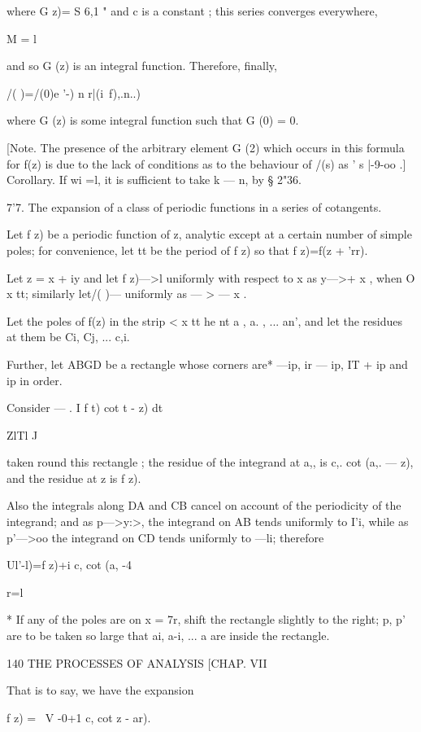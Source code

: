 {where G z)= S 6,1 " and c is a constant ; this series converges
everywhere,

M = l

and so G (z) is an integral function. Therefore, finally,

/( )=/(0)e '-) n r|(i\ f),.n..)

where G (z) is some integral function such that G (0) = 0.

[Note. The presence of the arbitrary element G (2) which occurs in
this formula for f(z) is due to the lack of conditions as to the
behaviour of /(s) as ' s |-9-oo .] Corollary. If wi =l, it is
sufficient to take k — n, by § 2"36.

7'7. The expansion of a class of periodic functions in a series of
cotangents.

Let f z) be a periodic function of z, analytic except at a certain
number of simple poles; for convenience, let tt be the period of f z)
so that f z)=f(z + 'rr).

Let z = x + iy and let f z)—>l uniformly with respect to x as y—>+ x ,
when O x tt; similarly let/( )— uniformly as — > — x .

Let the poles of f(z) in the strip < x tt he nt a , a. , ... an', and
let the residues at them be Ci, Cj, ... c,i.

Further, let ABGD be a rectangle whose corners are* —ip, ir — ip, IT +
ip and ip in order.

Consider — . I f t) cot t - z) dt

ZlTl J

taken round this rectangle ; the residue of the integrand at a,, is
c,. cot (a,. — z), and the residue at z is f z).

Also the integrals along DA and CB cancel on account of the
periodicity of the integrand; and as p—>y:>, the integrand on AB tends
uniformly to I'i, while as p'—>oo the integrand on CD tends uniformly
to —li; therefore

Ul'-l)=f z)+i c, cot (a, -4

r=l

* If any of the poles are on x = 7r, shift the rectangle slightly to
the right; p, p' are to be taken so large that ai, a-i, ... a are
inside the rectangle.



140 THE PROCESSES OF ANALYSIS [CHAP. VII

That is to say, we have the expansion

f z) = \ V -0+1 c, cot z - ar).

}
